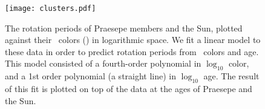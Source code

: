 \begin{figure}
  \caption{
    The rotation periods of Praesepe members and the Sun, plotted against
    their \Gaia\ colors (\gcolor) in logarithmic space.
    We fit a linear model to these data in order to predict
    rotation periods from \gaia\ colors and age.
    This model consisted of a fourth-order polynomial in $\log_{10}$ color,
    and a 1st order polynomial (a straight line) in $\log_{10}$ age.
The result of this fit is plotted on top of the data at the ages of
    Praesepe and the Sun.
}
  \centering
    \texttt{[image: clusters.pdf]}
\label{fig:clusters}
\end{figure}


